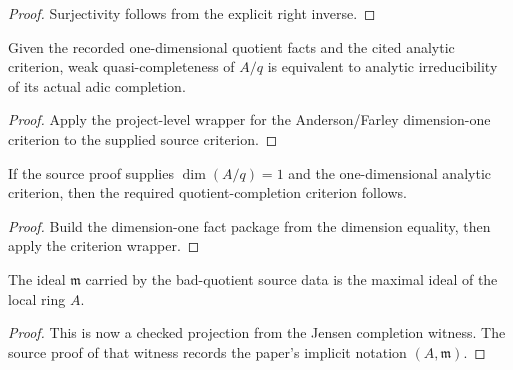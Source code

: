 \begin{proof}
  Surjectivity follows from the explicit right inverse.
\end{proof}

\begin{lemma}
  \label{lem:quotient_dimension_one_facts_dimension_one_criterion_of_source}
  Given the recorded one-dimensional quotient facts and the cited analytic
  criterion, weak quasi-completeness of \(A/q\) is equivalent to analytic
  irreducibility of its actual adic completion.
\end{lemma}

\begin{proof}
  Apply the project-level wrapper for the Anderson/Farley dimension-one
  criterion to the supplied source criterion.
\end{proof}

\begin{lemma}
  \label{lem:quotient_dimension_one_criterion_on_quotient_completion_of_source}
  If the source proof supplies \(\dim(A/q)=1\) and the one-dimensional analytic
  criterion, then the required quotient-completion criterion follows.
\end{lemma}

\begin{proof}
  Build the dimension-one fact package from the dimension equality, then apply
  the criterion wrapper.
\end{proof}

\begin{lemma}
  \label{lem:bad_quotient_source_data_adic_ideal_eq_maximal_ideal_source}
  The ideal \(\mathfrak m\) carried by the bad-quotient source data is the
  maximal ideal of the local ring \(A\).
\end{lemma}

\begin{proof}
  This is now a checked projection from the Jensen completion witness.  The
  source proof of that witness records the paper's implicit notation
  \((A,\mathfrak m)\).
\end{proof}

